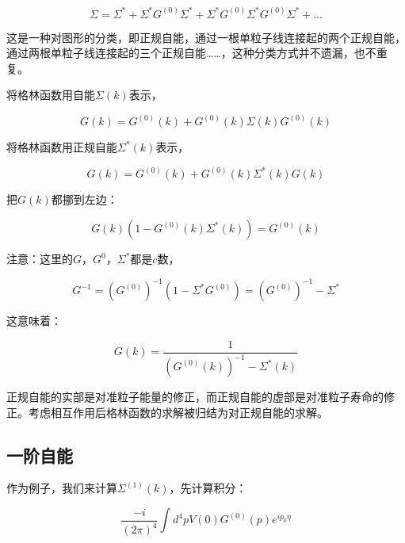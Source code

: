 \begin{equation}
\Sigma = \Sigma^* + \Sigma^* G^{(0)} \Sigma^* + \Sigma^* G^{(0)} \Sigma^* G^{(0)} \Sigma^* + ...
\end{equation}

这是一种对图形的分类，即正规自能，通过一根单粒子线连接起的两个正规自能，通过两根单粒子线连接起的三个正规自能……，这种分类方式并不遗漏，也不重复。

将格林函数用自能$\Sigma (k)$表示，

\begin{equation}
G(k) = G^{(0)}(k) + G^{(0)}(k) \Sigma(k) G^{(0)}(k)
\end{equation}

将格林函数用正规自能$\Sigma^* (k)$表示，

\begin{equation}
G(k) = G^{(0)}(k) + G^{(0)}(k) \Sigma^* (k) G(k)
\end{equation}

把$G(k)$都挪到左边：

\begin{equation*}
G(k) \left( 1 - G^{(0)} (k) \Sigma^* (k)  \right) = G^{(0)}(k)  
\end{equation*}

注意：这里的$G$，$G^0$，$\Sigma^* $都是$c$数，

\begin{equation*}
G^{-1} = \left( G^{(0)} \right)^{-1} \left( 1 - \Sigma^*  G^{(0)}  \right) = \left( G^{(0)} \right)^{-1} - \Sigma^*
\end{equation*}

这意味着：

\begin{equation}
G(k) = \frac{1}{  \left( G^{(0)} (k) \right)^{-1} - \Sigma^* (k)  }
\end{equation}

正规自能的实部是对准粒子能量的修正，而正规自能的虚部是对准粒子寿命的修正。考虑相互作用后格林函数的求解被归结为对正规自能的求解。

\subsection{一阶自能}

作为例子，我们来计算$\Sigma^{(1)}(k)$，先计算积分：

\begin{equation}
\frac{-i}{(2 \pi)^4} \int d^4 p V(0) G^{(0)}(p) e^{i p_0 \eta}
\end{equation}

